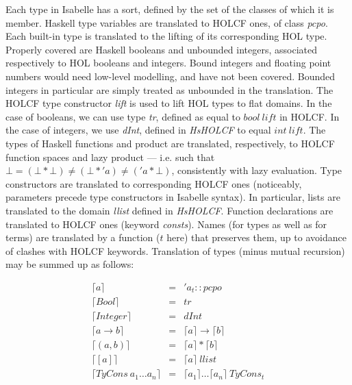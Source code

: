\documentclass{llncs}
\begin{document}
Each type in Isabelle has a sort, defined by the set of the classes of
which it is member.  Haskell type variables are translated to HOLCF
ones, of class \emph{pcpo}. Each built-in type is translated to the
lifting of its corresponding HOL type. Properly covered are Haskell
booleans and unbounded integers, associated respectively to HOL
booleans and integers.
Bound integers and floating point numbers would need low-level
modelling, and have not been covered.  Bounded integers in particular
are simply treated as unbounded in the translation. The HOLCF type
constructor \emph{lift} is used to lift HOL types to flat domains.  In
the case of booleans, we can use type \emph{tr}, defined as equal to
$bool \ lift$ in HOLCF. In the case of integers, we use \emph{dInt},
defined in \emph{HsHOLCF} to equal $int \ lift$. The types of Haskell
functions and product are translated, respectively, to HOLCF function
spaces and lazy product --- i.e. such that $\bot = (\bot * \bot) \neq
(\bot*'a) \neq ('a * \bot)$, consistently with lazy evaluation. Type
constructors are translated to corresponding HOLCF ones (noticeably,
parameters precede type constructors in Isabelle syntax). In
particular, lists are translated to the domain \emph{llist} defined in
\emph{HsHOLCF}.  Function declarations are translated to HOLCF ones
(keyword \emph{consts}). Names (for types as well as for terms) are
translated by a function ($t$ here) that preserves them, up to
avoidance of clashes with HOLCF keywords. Translation of types (minus
mutual recursion) may be summed up as follows:


$$\begin{array}{lcl}
  \lceil a \rceil & = & 'a_{t}::pcpo \\
  \lceil Bool \rceil & = & tr \\
  \lceil Integer \rceil & = & dInt \\
  \lceil a \to b \rceil & = & \lceil a \rceil \to \lceil b \rceil \\
  \lceil (a,b) \rceil & = & \lceil a \rceil * \lceil b \rceil \\
  \lceil [a] \rceil & = & \lceil a \rceil \ llist \\
  \lceil TyCons \ a_{1} \ldots a_{n} \rceil & = & \lceil a_{1} \rceil \ldots \lceil a_{n} \rceil \ TyCons_{t} 
\end{array}$$
\end{document}
